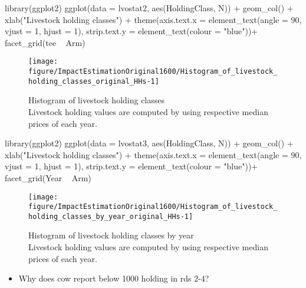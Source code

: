 \begin{Schunk}
\begin{Sinput}
library(ggplot2)
ggplot(data = lvostat2, aes(HoldingClass, N)) + 
  geom_col() +
  xlab("Livestock holding classes") +
  theme(axis.text.x = element_text(angle = 90, vjust = 1, hjust = 1), 
    strip.text.y = element_text(colour = "blue"))+
  facet_grid(tee ~ Arm)
\end{Sinput}
\begin{figure}

{\centering \texttt{[image: figure/ImpactEstimationOriginal1600/Histogram\_of\_livestock\_holding\_classes\_original\_HHs-1]} 

}

\caption{Histogram of livestock holding classes\\ {\footnotesize Livestock holding values are computed by using respective median prices of each year.\setlength{\baselineskip}{8pt}}}\label{Figure Histogram of livestock holding classes original HHs}
\end{figure}
\end{Schunk}
\begin{Schunk}
\begin{Sinput}
library(ggplot2)
ggplot(data = lvostat3, aes(HoldingClass, N)) + 
  geom_col() +
  xlab("Livestock holding classes") +
  theme(axis.text.x = element_text(angle = 90, vjust = 1, hjust = 1), 
    strip.text.y = element_text(colour = "blue"))+
  facet_grid(Year ~ Arm)
\end{Sinput}
\begin{figure}

{\centering \texttt{[image: figure/ImpactEstimationOriginal1600/Histogram\_of\_livestock\_holding\_classes\_by\_year\_original\_HHs-1]} 

}

\caption{Histogram of livestock holding classes by year\\ {\footnotesize Livestock holding values are computed by using respective median prices of each year.\setlength{\baselineskip}{8pt}}}\label{Figure Histogram of livestock holding classes by year original HHs}
\end{figure}
\end{Schunk}
\begin{itemize}
\vspace{1.0ex}\setlength{\itemsep}{1.0ex}\setlength{\baselineskip}{12pt}
\item	Why does \textsf{cow} report below 1000 holding in rds 2-4?
\end{itemize}

